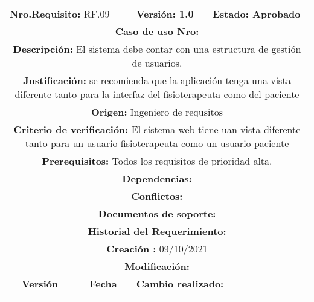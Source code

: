 \begin{center}
\begin{tabular}{|c|c|p{4cm}|p{4cm}|}
            \hline
            \rowcolor{red} \multicolumn{4}{|c|}{\textbf{Prioridad:} Alta}  \\
            \hline
            \multicolumn{2}{|l}{\textbf{Nro.Requisito: }RF.09} & \multicolumn{1}{|l}{\textbf{Versión: 1.0}} & \multicolumn{1}{|l|}{\textbf{Estado: Aprobado}} \\
            \multicolumn{4}{|p{13cm}|}{\textbf{Caso de uso Nro: }}  \\
            \hline
            \multicolumn{4}{|p{13cm}|}{\textbf{Descripción: } El sistema debe contar con una estructura de gestión de usuarios. } \\
            \multicolumn{4}{|p{13cm}|}{\textbf{Justificación: } se recomienda que la aplicación tenga una vista diferente tanto para la interfaz del fisioterapeuta como del paciente } \\ 
            \multicolumn{4}{|p{13cm}|}{\textbf{Origen: }Ingeniero de requsitos}  \\
            \multicolumn{4}{|p{13cm}|}{\textbf{Criterio de verificación: } El sistema web tiene uan vista diferente tanto para un usuario fisioterapeuta como un usuario paciente  } \\
            \hline
            \multicolumn{4}{|p{13cm}|}{\textbf{Prerequisitos: } Todos los requisitos de prioridad alta. }\\
            \hline \multicolumn{4}{|p{12cm}|}{\textbf{Dependencias: }
                }  \\
            \multicolumn{4}{|p{12cm}|}{\textbf{Conflictos: }}  \\
            \hline
            \multicolumn{4}{|p{12cm}|}{\textbf{Documentos de soporte: }}  \\
            \hline
            \multicolumn{4}{|p{12cm}|}{\textbf{Historial del Requerimiento: }}  \\
            \multicolumn{4}{|p{12cm}|}{\textbf{Creación : }09/10/2021}  \\
            \multicolumn{4}{|p{12cm}|}{\textbf{Modificación: }}  \\
             \textbf{Versión} & \textbf{Fecha} & \multicolumn{2}{p{8cm}|}{\textbf{Cambio realizado:}} \\
            \hline
               & &   \multicolumn{2}{p{8cm}|}{}
              \\
            \hline
\end{tabular}





\end{center}

